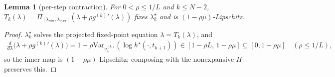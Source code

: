 \documentclass[11pt]{article}
\newcommand{\Var}{\mathrm{Var}}
\newcommand{\hs}{h^\star}
\newcommand{\proj}{\Pi}
\newcommand{\lmin}{\lambda_{\min}}
\newcommand{\lmax}{\lambda_{\max}}
\theoremstyle{plain}
\newtheorem{lemma}{Lemma}
\theoremstyle{definition}
\theoremstyle{remark}
\begin{document}
\begin{lemma}[per-step contraction]
\label{lem:contr}
For $0<\rho\le1/L$ and $k\le N-2$, $T_k(\lambda)=\proj_{[\lmin,\lmax]}(\lambda+\rho g^{(k)}{}'(\lambda))$
fixes $\lambda^\star_k$ and is $(1-\rho\mu)$-Lipschitz.
\end{lemma}
\begin{proof}
$\lambda^\star_k$ solves the projected fixed-point equation $\lambda=T_k(\lambda)$, and
\begin{gather*}
\frac{d}{d\lambda}\big(\lambda+\rho g^{(k)}{}'(\lambda)\big)=1-\rho\Var_{q^{(k)}_\lambda}(\log\hs(\cdot,t_{k+1}))\in[1-\rho L,\,1-\rho\mu]\subseteq[0,1-\rho\mu]\quad(\rho\le1/L),
\end{gather*}
so the inner map is $(1-\rho\mu)$-Lipschitz; composing with the nonexpansive $\proj$ preserves this.
\end{proof}
\end{document}
